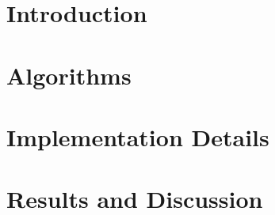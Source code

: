 \documentclass[10pt]{SelfArx} %
\affiliation{\textsuperscript{1}\textit{Department of Computer Science}} %
\begin{document}
\flushbottom %

\maketitle %

\tableofcontents %

\thispagestyle{empty} %


\section*{Introduction} %




\section{Algorithms}


\section{Implementation Details}


\section{Results and Discussion}

\end{document}
